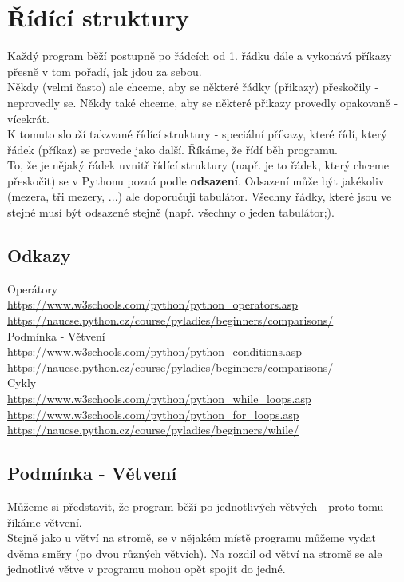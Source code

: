 \section{Řídící struktury}
Každý program běží postupně po řádcích od 1. řádku dále a vykonává příkazy přesně v tom pořadí, jak jdou za sebou.\\
Někdy (velmi často) ale chceme, aby se některé řádky (přikazy) přeskočily - neprovedly se. Někdy také chceme, aby se některé přikazy provedly opakovaně - vícekrát.\\
K tomuto slouží takzvané řídící struktury - speciální příkazy, které řídí, který řádek (příkaz) se provede jako další. Říkáme, že řídí běh programu.\\
To, že je nějaký řádek uvnitř řídící struktury (např. je to řádek, který chceme přeskočit) se v Pythonu pozná podle \textbf{odsazení}. Odsazení může být jakékoliv (mezera, tři mezery, ...) ale doporučuji tabulátor. Všechny řádky, které jsou ve stejné  musí být odsazené stejně (např. všechny o jeden tabulátor;). 

\subsection{Odkazy}
Operátory\\ \url{https://www.w3schools.com/python/python_operators.asp} \\ \url{https://naucse.python.cz/course/pyladies/beginners/comparisons/}\\
Podmínka - Větvení\\ \url{https://www.w3schools.com/python/python_conditions.asp} \\ \url{https://naucse.python.cz/course/pyladies/beginners/comparisons/}\\
Cykly \\ \url{https://www.w3schools.com/python/python_while_loops.asp}\\ \url{https://www.w3schools.com/python/python_for_loops.asp} \\ \url{https://naucse.python.cz/course/pyladies/beginners/while/}

\subsection{Podmínka - Větvení}
Můžeme si představit, že program běží po jednotlivých větvých - proto tomu říkáme větvení.\\ 
Stejně jako u větví na stromě, se v nějakém místě programu můžeme vydat dvěma směry (po dvou různých větvích). Na rozdíl od větví na stromě se ale jednotlivé větve v programu mohou opět spojit do jedné. 


